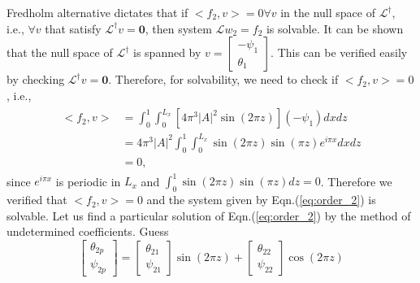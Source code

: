 \documentclass{article}
\newcommand{\bsym}[1]{\boldsymbol{#1}}
\begin{document}
% 
Fredholm alternative dictates that if $< f_{2}, v > = 0 \forall v$ in the null space of $ \mathcal{L}^{\dagger}$, i.e., $\forall v$ that satisfy $ \mathcal{L}^{\dagger} v = \bsym{0}$, then system $ \mathcal{L} w_{2} = f_{2}$ is solvable. It can be shown that the null space of $ \mathcal{L}^{\dagger}$ is spanned by 
$v = \begin{bmatrix}
-\psi_{1}\\                                                                                                                                                                                                                                                                                                                                  
\theta_{1}                                                                                                                                                                                                                                                                                                                               \end{bmatrix}$. This can be verified easily by checking $\mathcal{L}^{\dagger} v = \bsym{0}$. Therefore, for solvability, we need to check if $<f_{2}, v> = 0$, i.e.,
\begin{align}
    \begin{split}
     <f_{2}, v>  &= \int_{0}^{1}\int_{0}^{L_{x}} [4 \pi^{3} |A|^{2} \sin{(2 \pi z)}](-\psi_{1}) dx dz \\
     &= 4 \pi^{3} |A|^{2} \int_{0}^{1}\int_{0}^{L_{x}} \sin{(2 \pi z)} \sin{(\pi z)} e^{i\pi x}dx dz\\
     &=0,
    \end{split}
\end{align}
since $e^{i\pi x}$ is periodic in $L_{x}$ and $\int_{0}^{1} \sin{(2 \pi z)} \sin{(\pi z)} dz = 0$. Therefore we verified that $<f_{2}, v> = 0$ and the system given by Eqn.(\ref{eq:order_2}) is solvable.
%
Let us find a particular solution of Eqn.(\ref{eq:order_2}) by the method of undetermined coefficients. Guess
\begin{equation}
 \begin{bmatrix}
  \theta_{2p}\\
  \psi_{2p}
 \end{bmatrix}
 = 
 \begin{bmatrix}
  \theta_{21}\\
  \psi_{21}
 \end{bmatrix} \sin{(2 \pi z)} + \begin{bmatrix}
  \theta_{22}\\
  \psi_{22}
 \end{bmatrix} \cos{(2 \pi z)}
\end{equation}
\end{document}
